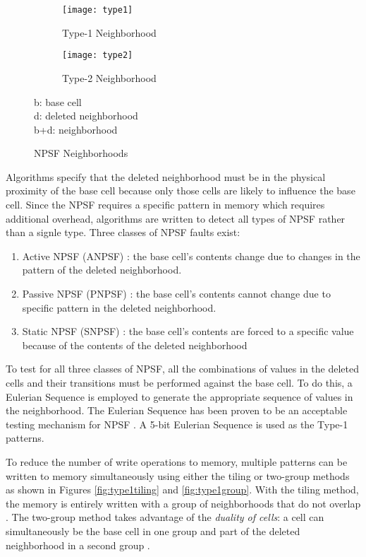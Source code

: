 \begin{figure}[H]
  \centering
  \begin{subfigure}[b]{0.4\textwidth}
    \texttt{[image: type1]}
    \caption{Type-1 Neighborhood}
    \label{fig:type1}
  \end{subfigure}
  \begin{subfigure}[b]{0.4\textwidth}
    \texttt{[image: type2]}
    \caption{Type-2 Neighborhood}
    \label{fig:type2}
  \end{subfigure}
  \caption[NPSF Neighborhoods]{NPSF Neighborhoods} 
           b: base cell \\
           d: deleted neighborhood \\
           b+d: neighborhood
  \label{fig:npsftypes}
\end{figure}

Algorithms specify that the deleted neighborhood must be in the physical proximity of the base cell because only those cells are likely to influence the base cell.  Since the NPSF requires a specific pattern in memory which requires additional overhead, algorithms are written to detect all types of NPSF rather than a signle type.  Three classes of NPSF faults exist:
\begin{enumerate}
  \item Active NPSF (ANPSF) \cite{1675601}: the base cell's contents change due to changes in the pattern of the deleted neighborhood.
  \item Passive NPSF (PNPSF) \cite{1675601}: the base cell's contents cannot change due to specific pattern in the deleted neighborhood.
  \item Static NPSF (SNPSF) \cite{1676572}: the base cell's contents are forced to a specific value because of the contents of the deleted neighborhood
\end{enumerate}

To test for all three classes of NPSF, all the combinations of values in the deleted cells and their transitions must be performed against the base cell.  To do this, a Eulerian Sequence is employed to generate the appropriate sequence of values in the neighborhood.  The Eulerian Sequence has been proven to be an acceptable testing mechanism for NPSF \cite{1675556}.  A 5-bit Eulerian Sequence is used as the Type-1 patterns.

To reduce the number of write operations to memory, multiple patterns can be written to memory simultaneously using either the tiling or two-group methods as shown in Figures \ref{fig:type1tiling} and \ref{fig:type1group}.  With the tiling method, the memory is entirely written with a group of neighborhoods that do not overlap \cite{VanDeGoor1991}.  The two-group method takes advantage of the \textit{duality of cells}: a cell can simultaneously be the base cell in one group and part of the deleted neighborhood in a second group \cite{1675601}.  

